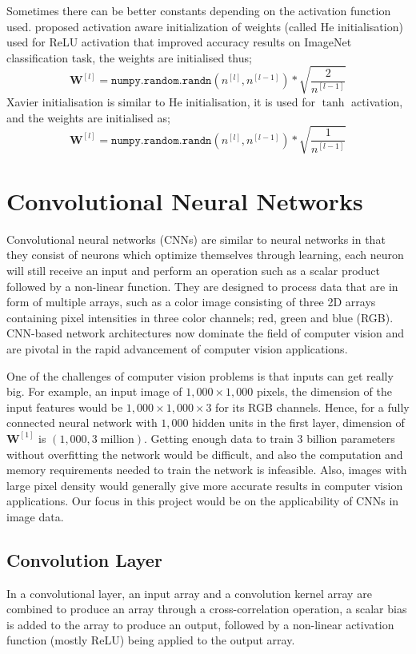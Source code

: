 \documentclass[12pt]{report}
\numberwithin{equation}{section}
\begin{document}
Sometimes there can be better constants depending on the activation function used. \textbf{\cite{10.1109/ICCV.2015.123}} proposed activation aware initialization of weights (called He initialisation) used for ReLU activation that improved accuracy results on ImageNet classification task, the weights are initialised thus;
\[
\bm{W}^{[l]} = \texttt{numpy.random.randn}(n^{[l]},n^{[l-1]}) * \sqrt{\frac{2}{n^{[l-1]}}}
\]
Xavier initialisation is similar to He initialisation, it is used for $\tanh$ activation, and the weights are initialised as;
\[
\bm{W}^{[l]} = \texttt{numpy.random.randn}(n^{[l]},n^{[l-1]}) * \sqrt{\frac{1}{n^{[l-1]}}}
\]

\section{Convolutional Neural Networks}
Convolutional neural networks (CNNs) are similar to neural networks in that they consist of neurons which optimize themselves through learning, each neuron will still receive an input and perform an operation such as a scalar product followed by a non-linear function. They are designed to process data that are in form of multiple arrays, such as a color image consisting of three 2D arrays containing pixel intensities in three color channels; red, green and blue (RGB). CNN-based network architectures now dominate the field of computer vision and are pivotal in the rapid advancement of computer vision applications.

One of the challenges of computer vision problems is that inputs can get really big. For example, an input image of $1,000\times 1,000$ pixels, the dimension of the input features would be $1,000\times 1,000\times 3$ for its RGB channels. Hence, for a fully connected neural network with $1,000$  hidden units in the first layer, dimension of $\bm{W}^{[1]}$ is $(1,000,3\;\text{million})$. Getting enough data to train $3$ billion parameters without overfitting the network would be difficult, and also the computation and memory requirements needed to train the network is infeasible. Also, images with large pixel density would generally give more accurate results in computer vision applications. Our focus in this project would be on the applicability of CNNs in image data.

\subsection{Convolution Layer} \label{subsec:conv_layer}
In a convolutional layer, an input array and a convolution kernel array are combined to produce an array through a cross-correlation operation, a scalar bias is added to the array to produce an output, followed by a non-linear activation function (mostly ReLU) being applied to the output array. 
\end{document}
